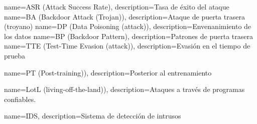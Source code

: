   {name={ASR (Attack Success Rate)},          description={Tasa de éxito del ataque}}
   {name={BA (Backdoor Attack (Trojan))},      description={Ataque de puerta trasera (troyano)}}
   {name={DP (Data Poisoning (attack))},       description={Envenanimiento de los datos}}
   {name={BP (Backdoor Pattern)},              description={Patrones de puerta trasera}}
  {name={TTE (Test-Time Evasion (attack))},   description={Evasión en el tiempo de prueba}}


  {name={PT (Post-training))},   description={Posterior al entrenamiento}}


  {name={LotL (living-off-the-land))},   description={Ataques a través de programas confiables.}}

    {name={IDS},          description={Sistema de detección de intrusos}}

